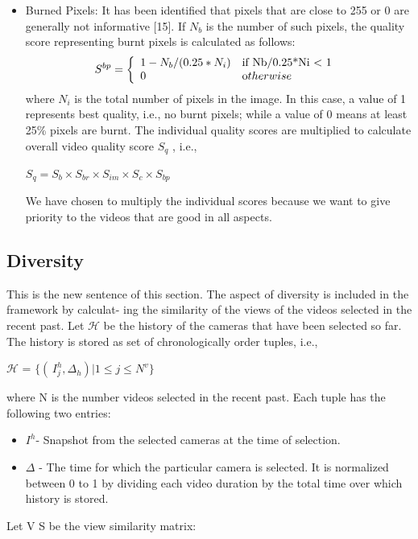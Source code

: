 \documentclass{sig-alternate}
\begin{document}
{{{\begin{itemize}
\item Burned Pixels: It has been identified that pixels that are
close to 255 or 0 are generally not informative [15]. If $N_b$
is the number of such pixels, the quality score representing
burnt pixels is calculated as follows: 
\begin{align*}
S^{bp} =          
\left\{
    \begin{array}{ll}
        1-N_b/(0.25*N_i)  & \mbox{if Nb/{0.25*Ni} < 1 } \\
        0 & \mbox otherwise
    \end{array}
\right.
\end{align*}
where $N_i$ is the total number of pixels in the image. In this
case, a value of 1 represents best quality, i.e., no burnt pixels;
while a value of 0 means at least 25\% pixels are burnt.
The individual quality scores are multiplied to calculate overall
video quality score $S_q$ , i.e.,
\begin{center}
$S_q = S_b \times S_{br} \times S_{im} \times S_c \times S_{bp}$
\end{center}
We have chosen to multiply the individual scores because we
want to give priority to the videos that are good in all aspects.
\end{itemize}




\subsection{Diversity}
This is the new sentence of this section.
The aspect of diversity is included in the framework by calculat-
ing the similarity of the views of the videos selected in the recent
past. Let $\mathcal{H}$ be the history of the cameras that have been selected
so far. The history is stored as set of chronologically order tuples,
i.e.,         
\begin{center}
$\mathcal{H}$ = $\{( \,I_j^h,\Delta_h ) |1 \leq j \leq N^v\}$
\end{center}
where N is the number videos selected in the recent past. Each
tuple has the following two entries:
\begin{itemize}
\item $I^h $- Snapshot from the selected cameras at the time of selection.
\item $\Delta$ - The time for which the particular camera is selected. It
is normalized between 0 to 1 by dividing each video duration
by the total time over which history is stored.
\end{itemize}
Let V S be the view similarity matrix:

}}}
\end{document}

